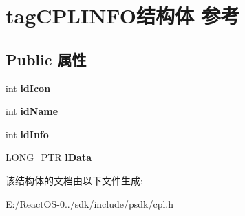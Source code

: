 \hypertarget{structtag_c_p_l_i_n_f_o}{}\section{tag\+C\+P\+L\+I\+N\+F\+O结构体 参考}
\label{structtag_c_p_l_i_n_f_o}
\subsection*{Public 属性}
\begin{DoxyCompactItemize}
\item 
\mbox{\label{structtag_c_p_l_i_n_f_o_ac89704d4469c5694979549ab60eabef9}} 
int {\bfseries id\+Icon}
\item 
\mbox{\label{structtag_c_p_l_i_n_f_o_a619b2fe1db7e39f5189519577a106a3d}} 
int {\bfseries id\+Name}
\item 
\mbox{\label{structtag_c_p_l_i_n_f_o_a663e7db1fc3f557dce15b725988a1398}} 
int {\bfseries id\+Info}
\item 
\mbox{\label{structtag_c_p_l_i_n_f_o_a085b21d551d7fba9e1b16bcdbfeb2f48}} 
L\+O\+N\+G\+\_\+\+P\+TR {\bfseries l\+Data}
\end{DoxyCompactItemize}


该结构体的文档由以下文件生成\+:\begin{DoxyCompactItemize}
\item 
E\+:/\+React\+O\+S-\/0../sdk/include/psdk/cpl.\+h\end{DoxyCompactItemize}

